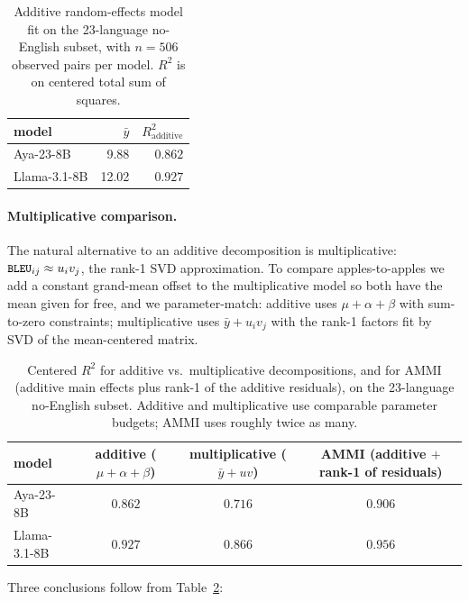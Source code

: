 \documentclass[11pt]{article}
\newcommand{\code}[1]{\texttt{\small #1}}
\begin{document}
\begin{table}[h]
\centering
\small
\begin{tabular}{lrr}
\toprule
model & $\bar y$ & $R^2_{\text{additive}}$ \\
\midrule
Aya-23-8B    & 9.88  & $0.862$ \\
Llama-3.1-8B & 12.02 & $0.927$ \\
\bottomrule
\end{tabular}
\caption{Additive random-effects model fit on the 23-language no-English
subset, with $n = 506$ observed pairs per model. $R^2$ is on centered
total sum of squares.}
\label{tab:additive}
\end{table}

\paragraph{Multiplicative comparison.}
The natural alternative to an additive decomposition is multiplicative:
$\code{BLEU}_{ij} \approx u_i v_j$, the rank-1 SVD approximation. To
compare apples-to-apples we add a constant grand-mean offset to the
multiplicative model so both have the mean given for free, and we
parameter-match: additive uses $\mu + \alpha + \beta$ with sum-to-zero
constraints; multiplicative uses $\bar y + u_i v_j$ with the rank-1
factors fit by SVD of the mean-centered matrix.

\begin{table}[h]
\centering
\small
\begin{tabular}{lccc}
\toprule
model & additive ($\mu + \alpha + \beta$)
      & multiplicative ($\bar y + u v$)
      & AMMI (additive $+$ rank-1 of residuals) \\
\midrule
Aya-23-8B    & $0.862$ & $0.716$ & $0.906$ \\
Llama-3.1-8B & $0.927$ & $0.866$ & $0.956$ \\
\bottomrule
\end{tabular}
\caption{Centered $R^2$ for additive vs.\ multiplicative
decompositions, and for AMMI (additive main effects plus rank-1 of
the additive residuals), on the 23-language no-English subset.
Additive and multiplicative use comparable parameter budgets;
AMMI uses roughly twice as many.}
\label{tab:add-vs-mul}
\end{table}

Three conclusions follow from Table~\ref{tab:add-vs-mul}:
\end{document}
